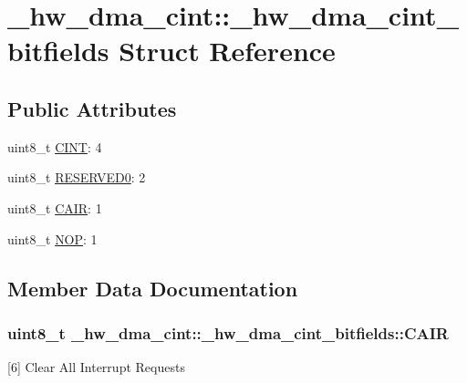 \hypertarget{struct__hw__dma__cint_1_1__hw__dma__cint__bitfields}{}\section{\+\_\+hw\+\_\+dma\+\_\+cint\+:\+:\+\_\+hw\+\_\+dma\+\_\+cint\+\_\+bitfields Struct Reference}
\label{struct__hw__dma__cint_1_1__hw__dma__cint__bitfields}
\subsection*{Public Attributes}
\begin{DoxyCompactItemize}
\item 
uint8\+\_\+t \hyperlink{struct__hw__dma__cint_1_1__hw__dma__cint__bitfields_a8a9f6bb954c6c3d5dcdc3581c1ede7bd}{C\+I\+NT}\+: 4
\item 
uint8\+\_\+t \hyperlink{struct__hw__dma__cint_1_1__hw__dma__cint__bitfields_acb6b05e97f429014084a581e498152a0}{R\+E\+S\+E\+R\+V\+E\+D0}\+: 2
\item 
uint8\+\_\+t \hyperlink{struct__hw__dma__cint_1_1__hw__dma__cint__bitfields_a372654b775a613b6cb96ca3a8e0ff806}{C\+A\+IR}\+: 1
\item 
uint8\+\_\+t \hyperlink{struct__hw__dma__cint_1_1__hw__dma__cint__bitfields_a1556a8b34f2e615156eacc5d3956f042}{N\+OP}\+: 1
\end{DoxyCompactItemize}


\subsection{Member Data Documentation}
\subsubsection[{\texorpdfstring{C\+A\+IR}{CAIR}}]{\setlength{\rightskip}{0pt plus 5cm}uint8\+\_\+t \+\_\+hw\+\_\+dma\+\_\+cint\+::\+\_\+hw\+\_\+dma\+\_\+cint\+\_\+bitfields\+::\+C\+A\+IR}\hypertarget{struct__hw__dma__cint_1_1__hw__dma__cint__bitfields_a372654b775a613b6cb96ca3a8e0ff806}{}\label{struct__hw__dma__cint_1_1__hw__dma__cint__bitfields_a372654b775a613b6cb96ca3a8e0ff806}
\mbox{[}6\mbox{]} Clear All Interrupt Requests 
